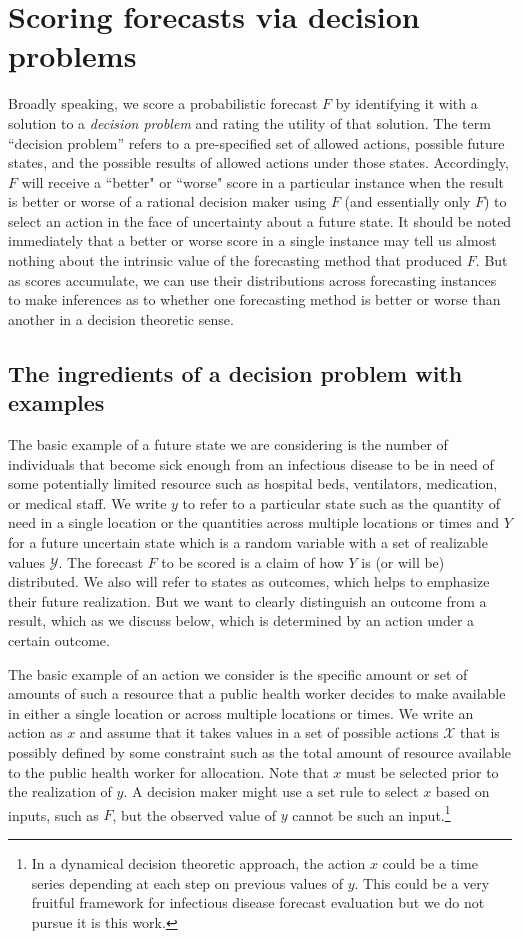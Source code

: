 \documentclass{article}
\begin{document}
\section{Scoring forecasts via decision problems}

Broadly speaking, we score a probabilistic forecast $F$ by identifying it with a solution to a \emph{decision problem} and rating the utility of that solution.  The term ``decision problem'' refers to a pre-specified set of allowed actions, possible future states, and the possible results of allowed actions under those states.  Accordingly, $F$ will receive a ``better" or ``worse" score in a particular instance when the result is better or worse of a rational decision maker using $F$ (and essentially only $F$) to select an action in the face of uncertainty about a future state.  It should be noted immediately that a better or worse score in a single instance may tell us almost nothing about the intrinsic value of the forecasting method that produced $F$.  But as scores accumulate, we can use their distributions across forecasting instances to make inferences as to whether one forecasting method is better or worse than another in a decision theoretic sense. 

\subsection{The ingredients of a decision problem with examples}
The basic example of a future state we are considering is the number of individuals that become sick enough from an infectious disease to be in need of some potentially limited resource such as hospital beds, ventilators, medication, or medical staff.  We write $y$ to refer to a particular state such as the quantity of need in a single location or the quantities across multiple locations or times and $Y$ for a future uncertain state which is a random variable with a set of realizable values $\mathcal{Y}$. The forecast $F$ to be scored is a claim of how $Y$ is (or will be) distributed. We also will refer to states as outcomes, which helps to emphasize their future realization.  But we want to clearly distinguish an outcome from a result, which as we discuss below, which is determined by an action under a certain outcome.

The basic example of an action we consider is the specific amount or set of amounts of such a resource that a public health worker decides to make available in either a single location or across multiple locations or times.  We write an action as $x$ and assume that it takes values in a set of possible actions $\mathcal{X}$ that is possibly defined by some constraint such as the total amount of resource available to the public health worker for allocation.  Note that $x$ must be selected prior to the realization of $y$.  A decision maker might use a set rule to select $x$ based on inputs, such as $F$, but the observed value of $y$ cannot be such an input.\footnote{In a dynamical decision theoretic approach, the action $x$ could be a time series depending at each step on previous values of $y$.  This could be a very fruitful framework for infectious disease forecast evaluation but we do not pursue it is this work.}
\end{document}
